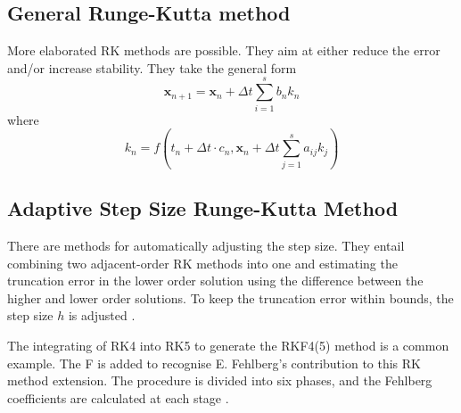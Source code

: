 \subsection{General Runge-Kutta method}
More elaborated RK methods are possible. They aim at either reduce the error and/or increase stability. They take the general form
\begin{equation} \label{eqn:39}
\mathbf{x}_{n+1}=\mathbf{x}_{n}+\Delta t \sum_{i=1}^{s} b_{n} k_{n}
\end{equation}
where
\begin{equation} \label{eqn:40}
    k_{n}=f\left(t_{n}+\Delta t \cdot c_{n}, \mathbf{x}_{n}+\Delta t \sum_{j=1}^{s} a_{i j} k_{j}\right)
\end{equation}


\subsection{Adaptive Step Size Runge-Kutta Method}

There are methods for automatically adjusting the step size. They entail combining two adjacent-order RK methods into one and estimating the truncation error in the lower order solution using the difference between the higher and lower order solutions. To keep the truncation error within bounds, the step size $h$ is adjusted \cite{curtis2013orbital}. 

The integrating of RK4 into RK5 to generate the RKF4(5) method is a common example. The F is added to recognise E. Fehlberg's contribution to this RK method extension. The procedure is divided into six phases, and the Fehlberg coefficients are calculated at each stage \cite{fehlberg1969low}.


